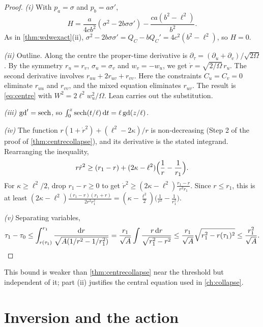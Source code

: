\begin{proof}
\emph{(i)} With $p_a=\sigma$ and $p_b=a\sigma'$,
\[
H=\frac a{4cb^2}(\sigma^2-2b\sigma\sigma')-\frac{ca(b^2-\ell^2)}{b^2}.
\]
As in \cref{thm:wdwexact}(ii), $\sigma^2-2b\sigma\sigma'=Q_C-bQ_C'=4c^2(b^2-\ell^2)$, so $H=0$.

\emph{(ii)} Outline. Along the centre the proper-time derivative is $\partial_\tau=(\partial_u+\partial_v)/\sqrt{2\Omega}$. By the symmetry $r_u=r_v$, $\sigma_u=\sigma_v$ and $w_v=-w_u$, we get $\dot r=\sqrt{2/\Omega}\,r_u$. The second derivative involves $r_{uu}+2r_{uv}+r_{vv}$. Here the constraints $C_u=C_v=0$ eliminate $r_{uu}$ and $r_{vv}$, and the mixed equation eliminates $r_{uv}$. The result is \eqref{eq:centre} with $W^2=2\ell^2w_u^2/\Omega$. Lean carries out the substitution.

\emph{(iii)} $\operatorname{gd}'=\operatorname{sech}$, so $\int_0^z\operatorname{sech}(t/\ell)\,\mathrm{d} t=\ell\operatorname{gd}(z/\ell)$.

\emph{(iv)} The function $r(1+\dot r^2)+(\ell^2-2\kappa)/r$ is non-decreasing (Step 2 of the proof of \cref{thm:centrecollapse}), and its derivative is the stated integrand. Rearranging the inequality,
\[
r\dot r^2\ge(r_1-r)+(2\kappa-\ell^2)\Bigl(\frac1r-\frac1{r_1}\Bigr).
\]
For $\kappa\ge\ell^2/2$, drop $r_1-r\ge0$ to get $\dot r^2\ge(2\kappa-\ell^2)\frac{r_1-r}{r^2r_1}$. Since $r\le r_1$, this is at least $(2\kappa-\ell^2)\frac{(r_1-r)(r_1+r)}{2r^2r_1^2}=(\kappa-\frac{\ell^2}2)\bigl(\frac1{r^2}-\frac1{r_1^2}\bigr)$.

\emph{(v)} Separating variables,
\[
\tau_1-\tau_0\le\int_{r(\tau_1)}^{r_1}\frac{\mathrm{d} r}{\sqrt{A(1/r^2-1/r_1^2)}}=\frac{r_1}{\sqrt A}\int\frac{r\,\mathrm{d} r}{\sqrt{r_1^2-r^2}}\le\frac{r_1}{\sqrt A}\sqrt{r_1^2-r(\tau_1)^2}\le\frac{r_1^2}{\sqrt A}.\qedhere
\]
\end{proof}


This bound is weaker than \cref{thm:centrecollapse} near the threshold but independent of it; part (ii) justifies the central equation used in \cref{ch:collapse}.

\section{Inversion and the action}

